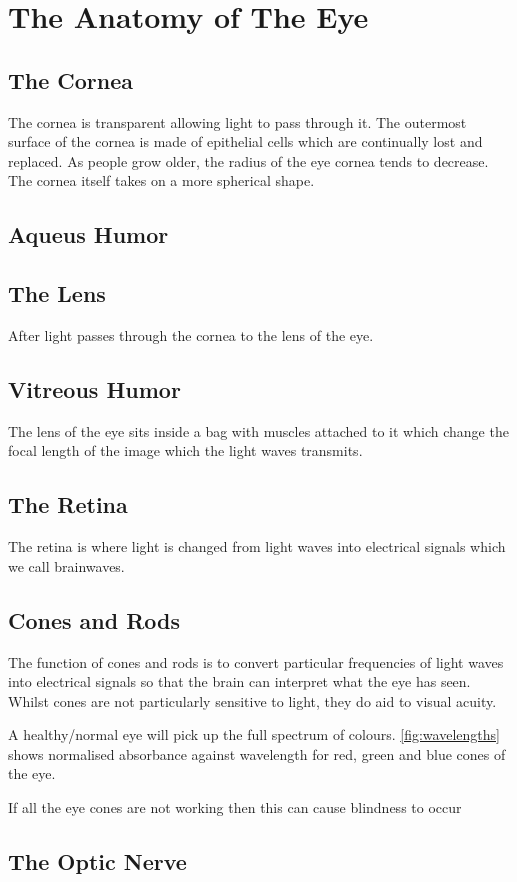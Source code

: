 
 \chapter{The Anatomy of The Eye}

\label{anatomy} %


\section{The Cornea}

The cornea is transparent allowing light to pass through it.
The outermost surface of the cornea is made of epithelial cells which are continually lost and replaced.
\cite{thoft1983x}
\cite{jester1999cellular,hassell2010molecular} As people grow older, the radius
of the eye cornea tends to decrease. The cornea itself takes on a more
spherical shape.\cite{guirao2000optical}

\section{Aqueus Humor}

\section{The Lens}
After light passes through the cornea to the lens of the eye.

\section{Vitreous Humor}

The lens of the eye sits inside a bag with muscles attached to it which change
the focal length of the image which the light waves transmits.

\section{The Retina}
The retina is where light is changed from light waves into electrical signals
which we call brainwaves.

\section{Cones and Rods}

The function of cones and rods is to convert particular frequencies of light
waves
into electrical signals so that the brain can interpret what the eye has seen.
Whilst cones are not particularly sensitive to light, they do aid to visual
acuity.
\cite{}

A healthy/normal eye will pick up the full spectrum of colours.
\ref{fig:wavelengths} shows normalised absorbance against wavelength for red,
green and blue cones of the eye.

If all the eye cones are not working then this can cause
blindness to occur\cite{}

\section{The Optic Nerve}
